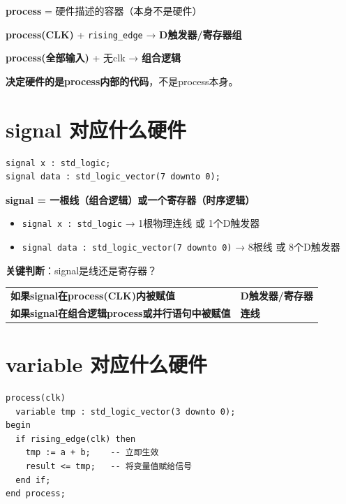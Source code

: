 \begin{keypoint}[process与硬件]
\textbf{process} = 硬件描述的容器（本身不是硬件）

\textbf{process(CLK)} + \texttt{rising\_edge} → \textbf{D触发器/寄存器组}

\textbf{process(全部输入)} + 无clk → \textbf{组合逻辑}

\textbf{决定硬件的是process内部的代码}，不是process本身。
\end{keypoint}

\section{signal 对应什么硬件}

\begin{lstlisting}
signal x : std_logic;
signal data : std_logic_vector(7 downto 0);
\end{lstlisting}

\textbf{signal = 一根线（组合逻辑）或一个寄存器（时序逻辑）}

\begin{itemize}
  \item \texttt{signal x : std\_logic} → 1根物理连线 或 1个D触发器
  \item \texttt{signal data : std\_logic\_vector(7 downto 0)} → 8根线 或 8个D触发器
\end{itemize}

\textbf{关键判断}：signal是线还是寄存器？

\begin{center}
\begin{tabular}{|l|l|}
\hline
\textbf{如果signal在process(CLK)内被赋值} & \textbf{D触发器/寄存器} \\
\textbf{如果signal在组合逻辑process或并行语句中被赋值} & \textbf{连线} \\
\hline
\end{tabular}
\end{center}

\section{variable 对应什么硬件}

\begin{lstlisting}
process(clk)
  variable tmp : std_logic_vector(3 downto 0);
begin
  if rising_edge(clk) then
    tmp := a + b;    -- 立即生效
    result <= tmp;   -- 将变量值赋给信号
  end if;
end process;
\end{lstlisting}

